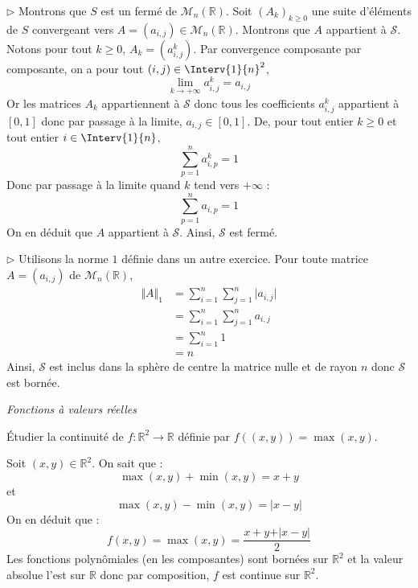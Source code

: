 \documentclass[a4paper,10pt]{report}
\begin{document}
\noindent $\rhd$ Montrons que $S$ est un fermé de $\mathcal{M}_n(\mathbb{R})$. Soit $(A_k)_{k \geq 0}$ une suite d'éléments de $S$ convergeant vers $A=(a_{i,j}) \in \mathcal{M}_n(\mathbb{R})$. Montrons que $A$ appartient à $\mathcal{S}$. Notons pour tout $k \geq 0$, $A_k = (a_{i,j}^k)$. Par convergence composante par composante, on a pour tout $(i,j) \in \Interv{1}{n}^2$,
$$ \lim_{k \rightarrow + \infty} a_{i,j}^k = a_{i,j}$$
Or les matrices $A_k$ appartiennent à $\mathcal{S}$ donc tous les coefficients $a_{i,j}^k$ appartient à $[0,1]$ donc par passage à la limite, $a_{i,j} \in [0,1]$. De, pour tout entier $k \geq 0$ et tout entier $i \in \Interv{1}{n}$,
$$ \sum_{p=1}^n a_{i,p}^k = 1$$
Donc par passage à la limite quand $k$ tend vers $+ \infty$ :
$$ \sum_{p=1}^n a_{i,p} = 1$$
On en déduit que $A$ appartient à $\mathcal{S}$. Ainsi, $\mathcal{S}$ est fermé.

\medskip

\noindent $\rhd$ Utilisons la norme $1$ définie dans un autre exercice. Pour toute matrice $A=(a_{i,j})$ de $\mathcal{M}_n(\mathbb{R})$,
\begin{align*}
\Vert A \Vert_1 & = \sum_{i = 1}^{n} \sum_{j = 1}^{n} \vert a_{i,j} \vert \\
& = \sum_{i = 1}^{n} \sum_{j = 1}^{n}  a_{i,j}  \\
 & = \sum_{i = 1}^{n} 1 \\
 & = n
\end{align*}
Ainsi, $\mathcal{S}$ est inclus dans la sphère de centre la matrice nulle et de rayon $n$ donc $\mathcal{S}$ est bornée.
\medskip

\begin{center}
\textit{{ {\large Fonctions à valeurs réelles}}}
\end{center}

\medskip



\begin{Exercice}{} Étudier la continuité de $f : \mathbb{R}^2 \rightarrow \mathbb{R}$ définie par $ f((x,y))=  \max(x,y)$.
\end{Exercice}

\corr Soit $(x,y) \in \mathbb{R}^2$. On sait que :
$$ \max(x,y)+ \min(x,y) = x+y$$
et 
$$ \max(x,y)-\min(x,y) = \vert x-y \vert$$
On en déduit que :
$$ f(x,y)= \max(x,y) = \dfrac{x+y+ \vert x-y \vert}{2}$$
Les fonctions polynômiales (en les composantes) sont bornées sur $\mathbb{R}^2$ et la valeur absolue l'est sur $\mathbb{R}$ donc par composition, $f$ est continue sur $\mathbb{R}^2$.
\end{document}
